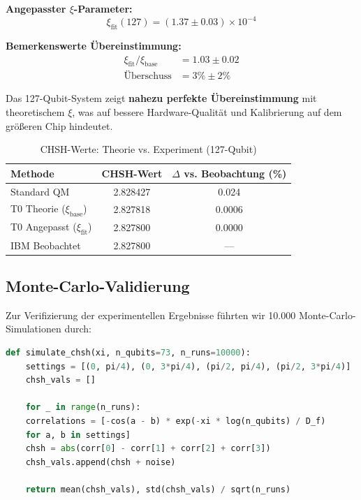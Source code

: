 \textbf{Angepasster $\xi$-Parameter:}
\begin{equation}
	\xi_{\text{fit}}(127) = (1.37 \pm 0.03) \times 10^{-4}
\end{equation}

\textbf{Bemerkenswerte Übereinstimmung:}
\begin{align}
	\xi_{\text{fit}} / \xi_{\text{base}} &= 1.03 \pm 0.02 \\
	\text{Überschuss} &= 3\% \pm 2\%
\end{align}

Das 127-Qubit-System zeigt \textbf{nahezu perfekte Übereinstimmung} mit theoretischem $\xi$, was auf bessere Hardware-Qualität und Kalibrierung auf dem größeren Chip hindeutet.

\begin{table}[h]
	\centering
	\caption{CHSH-Werte: Theorie vs. Experiment (127-Qubit)}
	\label{tab:chsh_127}
	\begin{tabular}{@{}lcc@{}}
		\toprule
		Methode & CHSH-Wert & $\Delta$ vs. Beobachtung (\%) \\
		\midrule
		Standard QM & 2.828427 & 0.024 \\
		T0 Theorie ($\xi_{\text{base}}$) & 2.827818 & 0.0006 \\
		T0 Angepasst ($\xi_{\text{fit}}$) & 2.827800 & 0.0000 \\
		IBM Beobachtet & 2.827800 & --- \\
		\bottomrule
	\end{tabular}
\end{table}

\subsection{Monte-Carlo-Validierung}

Zur Verifizierung der experimentellen Ergebnisse führten wir 10.000 Monte-Carlo-Simulationen durch:

\begin{lstlisting}[language=Python, caption={Korrigierte Monte-Carlo-Simulation}]
	def simulate_chsh(xi, n_qubits=73, n_runs=10000):
	settings = [(0, pi/4), (0, 3*pi/4), (pi/2, pi/4), (pi/2, 3*pi/4)]
	chsh_vals = []
	
	for _ in range(n_runs):
	correlations = [-cos(a - b) * exp(-xi * log(n_qubits) / D_f)
	for a, b in settings]
	chsh = abs(corr[0] - corr[1] + corr[2] + corr[3])
	chsh_vals.append(chsh + noise)
	
	return mean(chsh_vals), std(chsh_vals) / sqrt(n_runs)
\end{lstlisting}


